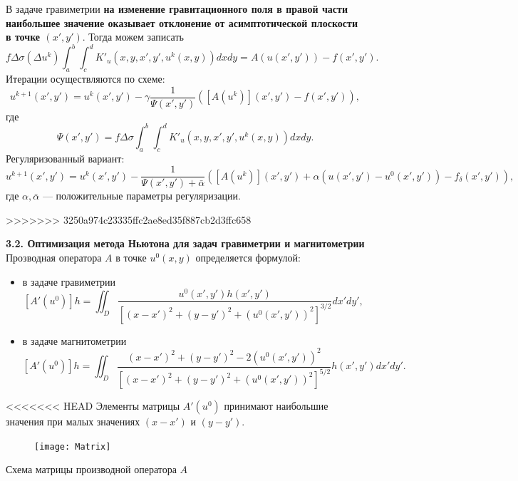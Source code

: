 \documentclass[10pt,pdf, mathserif, hyperref={unicode}]{beamer}
\begin{document}
\begin{frame}{}
	В задаче гравиметрии {\textbf{\color{blue}на изменение гравитационного поля в правой части наибольшее значение оказывает отклонение от асимптотической плоскости в точке $(x',y')$}}. Тогда можем записать
	$$f\Delta\sigma(\Delta u^k)\int_{a}^{b}\int_{c}^{d}K'_u(x,y, x',y',u^k(x,y)) dxdy=A(u(x',y'))-f(x',y').$$
	Итерации осуществляются по схеме:
	$$u^{k+1}(x',y')=u^k(x',y')-\gamma\frac{1}{\varPsi(x',y')}([A(u^k)](x',y')-f(x',y')),$$
	где $$\varPsi(x',y')=f\Delta\sigma\int_{a}^{b}\int_{c}^{d}K'_u(x,y, x',y',u^k(x,y)) dxdy.$$
	Регуляризованный вариант:
	$$u^{k+1}(x',y')=u^k(x',y')-\frac{1}{\varPsi(x',y')+\bar{\alpha}}([A(u^k)](x',y')+\alpha (u(x',y')-u^0(x',y'))-f_\delta(x',y')),$$
	где $\alpha, \bar{\alpha}$ --- положительные параметры регуляризации.
	\let\thefootnote\relax\let\thefootnote\relax{}
\end{frame}
>>>>>>> 3250a974c23335ffc2ae8ed35f887cb2d3ffc658
\begin{frame}{\small\textbf{3.2. Оптимизация метода Ньютона для задач гравиметрии и магнитометрии}}
	Прозводная оператора $A$ в точке $u^0(x,y)$ определяется формулой:
	\begin{itemize}
		\item в задаче гравиметрии
		$$ [A'(u^0)]h=\iint_{D} \frac{u^0(x',y')h(x',y')}{[(x-x')^2+(y-y')^2+(u^0(x',y'))^2]^{3/2}}dx'dy',$$
		\item в задаче магнитометрии
		$$ [A'(u^0)]h=\iint_{D} \frac{(x-x')^2+(y-y')^2-2(u^0(x',y'))^2}{[(x-x')^2+(y-y')^2+(u^0(x',y'))^2]^{5/2}}h(x',y')dx'dy'.$$
	\end{itemize}
<<<<<<< HEAD
Элементы матрицы $A'(u^0)$ принимают наибольшие значения при малых значениях $(x-x')$ и $(y-y')$.
\begin{figure}
	\texttt{[image: Matrix]}
\end{figure}
\centering \scriptsize Схема матрицы производной оператора $A$
\end{frame}
\end{document}
